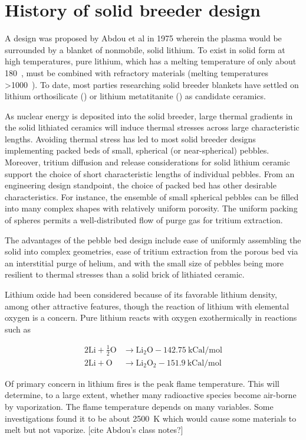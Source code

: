 \chapter{History of solid breeder design}\label{sec:solid-breeder-history}
A design was proposed by Abdou et al\cite{Abdou1975} in 1975 wherein the plasma would be surrounded by a blanket of nonmobile, solid lithium. To exist in solid form at high temperatures, pure lithium, which has a melting temperature of only about 180~\celsius, must be combined with refractory materials (melting temperatures >1000~\celsius). To date, most parties researching solid breeder blankets have settled on lithium orthosilicate (\lis) or lithium metatitanite (\lit) as candidate ceramics.

As nuclear energy is deposited into the solid breeder, large thermal gradients in the solid lithiated ceramics will induce thermal stresses across large characteristic lengths. Avoiding thermal stress has led to most solid breeder designs implementing packed beds of small, spherical (or near-spherical) pebbles.\cite{Lulewicz2002, Mandal2012a, Tsuchiya1998, Cho2012} Moreover, tritium diffusion and release considerations for solid lithium ceramic support the choice of short characteristic lengths of individual pebbles. From an engineering design standpoint, the choice of packed bed has other desirable characteristics. For instance, the ensemble of small spherical pebbles can be filled into many complex shapes with relatively uniform porosity. The uniform packing of spheres permits a well-distributed flow of purge gas for tritium extraction. 

The advantages of the pebble bed design include ease of uniformly assembling the solid into complex geometries, ease of tritium extraction from the porous bed via an interstitial purge of helium, and with the small size of pebbles being more resilient to thermal stresses than a solid brick of lithiated ceramic.\cite{Casadio2004} 


Lithium oxide had been considered because of its favorable lithium density, among other attractive features, though the reaction of lithium with elemental oxygen is a concern. Pure lithium reacts with oxygen exothermically in reactions such as

\begin{subequations}
\begin{align}
	2\mathrm{Li} + \frac{1}{2}\mathrm{O} &\rightarrow \mathrm{Li}_2\mathrm{O} - 142.75\ \text{kCal/mol}\\
	2\mathrm{Li} + \mathrm{O} &\rightarrow \mathrm{Li}_2\mathrm{O}_2 - 151.9\ \text{kCal/mol}
\end{align}
\end{subequations}

Of primary concern in lithium fires is the peak flame temperature. This will determine, to a large extent, whether many radioactive species become air-borne by vaporization. The flame temperature depends on many variables. Some investigations found it to be about 2500~K which would cause some materials to melt but not vaporize. [cite Abdou's class notes?]